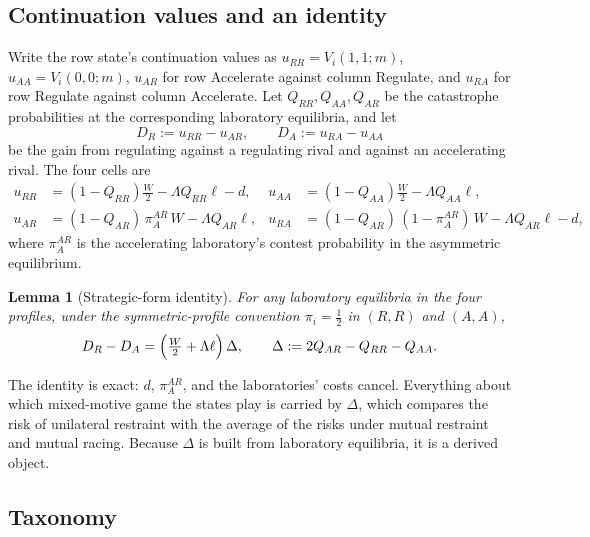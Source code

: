 \documentclass[11pt]{article}
\theoremstyle{plain}
\newtheorem{lemma}{Lemma}
\theoremstyle{definition}
\theoremstyle{remark}
\newcommand{\Lam}{\Lambda}
\newcommand{\Delt}{\Delta}
\begin{document}
\subsection{Continuation values and an identity}

Write the row state's continuation values as $u_{RR}=V_i(1,1;m)$, $u_{AA}=V_i(0,0;m)$, $u_{AR}$ for row Accelerate against column Regulate, and $u_{RA}$ for row Regulate against column Accelerate. Let $Q_{RR},Q_{AA},Q_{AR}$ be the catastrophe probabilities at the corresponding laboratory equilibria, and let
\begin{equation}
D_R:=u_{RR}-u_{AR},\qquad D_A:=u_{RA}-u_{AA}
\end{equation}
be the gain from regulating against a regulating rival and against an accelerating rival. The four cells are
\begin{align}
u_{RR}&=(1-Q_{RR})\tfrac{W}{2}-\Lam Q_{RR}\ell-d, & u_{AA}&=(1-Q_{AA})\tfrac{W}{2}-\Lam Q_{AA}\ell,\\
u_{AR}&=(1-Q_{AR})\,\pi_A^{AR}\,W-\Lam Q_{AR}\ell, & u_{RA}&=(1-Q_{AR})\,(1-\pi_A^{AR})\,W-\Lam Q_{AR}\ell-d,
\end{align}
where $\pi_A^{AR}$ is the accelerating laboratory's contest probability in the asymmetric equilibrium.

\begin{lemma}[Strategic-form identity]
For any laboratory equilibria in the four profiles, under the symmetric-profile convention $\pi_i=\tfrac12$ in $(R,R)$ and $(A,A)$,
\begin{equation}
D_R-D_A=\Bigl(\tfrac{W}{2}+\Lam\ell\Bigr)\,\Delt,\qquad \Delt:=2Q_{AR}-Q_{RR}-Q_{AA}.
\label{eq:identity}
\end{equation}
\end{lemma}

The identity is exact: $d$, $\pi_A^{AR}$, and the laboratories' costs cancel. Everything about which mixed-motive game the states play is carried by $\Delt$, which compares the risk of unilateral restraint with the average of the risks under mutual restraint and mutual racing. Because $\Delt$ is built from laboratory equilibria, it is a derived object.

\subsection{Taxonomy}
\end{document}
